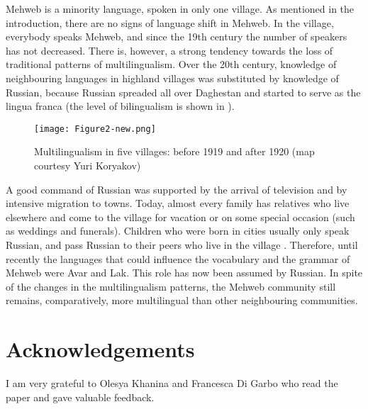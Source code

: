 \documentclass[output=paper]{langsci/langscibook}
\begin{document}
Mehweb is a minority language, spoken in only one village. As mentioned
in the introduction, there are no signs of language shift in Mehweb. In
the village, everybody speaks Mehweb, and since the 19th century the
number of speakers has not decreased. There is, however, a strong
tendency towards the loss of traditional patterns of multilingualism.
Over the 20th century, knowledge of neighbouring languages in highland
villages was substituted by knowledge of Russian, because Russian spreaded
all over Daghestan and started to serve as the lingua franca (the level
of bilingualism is shown in ).
%
\begin{figure}[ht]
\texttt{[image: Figure2-new.png]}

\caption{Multilingualism in five villages: before 1919 and after 1920
  (map courtesy Yuri Koryakov)}
\label{Figure2}
\end{figure}
%
A good command of Russian was
supported by the arrival of television and by intensive migration to
towns. Today, almost every family has relatives who live elsewhere and come to
the village for vacation or on some special occasion (such as weddings
and funerals). Children who were born in cities usually only speak
Russian, and pass Russian to their peers who live in the village
\citep{daniel-dobrushina-knyazev2011}. Therefore, until recently the languages that could
influence the vocabulary and the grammar of Mehweb were Avar and Lak.
This role has now been assumed by Russian. In spite of the changes in
the multilingualism patterns, the Mehweb community still remains,
comparatively, more multilingual than other neighbouring communities.


\section*{Acknowledgements}

I am very grateful to Olesya Khanina and Francesca Di Garbo who read
the paper and gave valuable feedback.



\nocite{komarov1873}

\printbibliography[heading=subbibliography,notkeyword=this]
\end{document}
